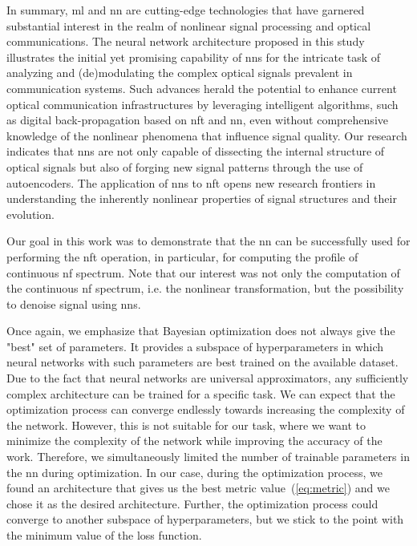 In summary, \acrlong{ml} and \acrlong{nn} are cutting-edge technologies that have garnered substantial interest in the realm of nonlinear signal processing and optical communications. The neural network architecture proposed in this study illustrates the initial yet promising capability of \acrshort{nn}s for the intricate task of analyzing and (de)modulating the complex optical signals prevalent in communication systems. Such advances herald the potential to enhance current optical communication infrastructures by leveraging intelligent algorithms, such as digital back-propagation based on \acrlong{nft} and \acrshort{nn}, even without comprehensive knowledge of the nonlinear phenomena that influence signal quality.
Our research indicates that \acrshort{nn}s are not only capable of dissecting the internal structure of optical signals but also of forging new signal patterns through the use of autoencoders. The application of \acrshort{nn}s to \acrshort{nft} opens new research frontiers in understanding the inherently nonlinear properties of signal structures and their evolution. 


Our goal in this work was to demonstrate that the \acrshort{nn} can be successfully used for performing the \acrshort{nft} operation, in particular, for computing the profile of continuous \acrshort{nf} spectrum. 
Note that our interest was not only the computation of the continuous \acrshort{nf} spectrum, i.e. the nonlinear transformation, but the possibility to denoise signal using \acrshort{nn}s. 

Once again, we emphasize that Bayesian optimization does not always give the "best" set of parameters.
It provides a subspace of hyperparameters in which neural networks with such parameters are best trained on the available dataset.
Due to the fact that neural networks are universal approximators, any sufficiently complex architecture can be trained for a specific task.
We can expect that the optimization process can converge endlessly towards increasing the complexity of the network.
However, this is not suitable for our task, where we want to minimize the complexity of the network while improving the accuracy of the work. 
Therefore, we simultaneously limited the number of trainable parameters in the \acrshort{nn} during optimization.
In our case, during the optimization process, we found an architecture that gives us the best metric value~(\ref{eq:metric}) and we chose it as the desired architecture. Further, the optimization process could converge to another subspace of hyperparameters, but we stick to the point with the minimum value of the loss function.

